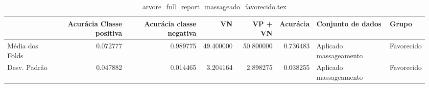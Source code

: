 \begin{table}
\centering
\caption{arvore_full_report_massageado_favorecido.tex}
\label{arvore_full_report_massageado_favorecido.tex}
\begin{tabular}{lrrrrrll}
\toprule
{} &  Acurácia Classe positiva &  Acurácia classe negativa &        VN  &   VP + VN  &  Acurácia &       Conjunto de dados &       Grupo \\
\midrule
Média dos Folds &                  0.072777 &                  0.989775 &  49.400000 &  50.800000 &  0.736483 &  Aplicado massageamento &  Favorecido \\
Desv. Padrão    &                  0.047882 &                  0.014465 &   3.204164 &   2.898275 &  0.038255 &  Aplicado massageamento &  Favorecido \\
\bottomrule
\end{tabular}
\end{table}
